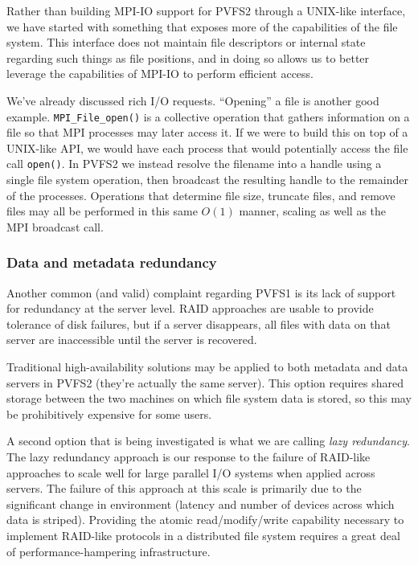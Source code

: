Rather than building MPI-IO support for PVFS2 through a UNIX-like interface,
we have started with something that exposes more of the capabilities of the
file system.  This interface does not maintain file descriptors or internal
state regarding such things as file positions, and in doing so allows us to
better leverage the capabilities of MPI-IO to perform efficient access.

We've already discussed rich I/O requests.  ``Opening'' a file is another good
example.  \texttt{MPI\_File\_open()} is a collective operation that gathers
information on a file so that MPI processes may later access it.  If we were
to build this on top of a UNIX-like API, we would have each process that would
potentially access the file call
\texttt{open()}.  In PVFS2 we instead resolve the filename into a handle using
a single file system operation, then broadcast the resulting handle to the
remainder of the processes.  Operations that determine file size, truncate
files, and remove files may all be performed in this same $O(1)$ manner,
scaling as well as the MPI broadcast call.

\subsubsection{Data and metadata redundancy}

Another common (and valid) complaint regarding PVFS1 is its lack of support
for redundancy at the server level.  RAID approaches are usable to provide
tolerance of disk failures, but if a server disappears, all files with data on
that server are inaccessible until the server is recovered.

Traditional high-availability solutions may be applied to both metadata and
data servers in PVFS2 (they're actually the same server).  This option
requires shared storage between the two machines on which file system data is
stored, so this may be prohibitively expensive for some users.

A second option that is being investigated is what we are calling \emph{lazy
redundancy}.  The lazy redundancy approach is our response to the failure of
RAID-like approaches to scale well for large parallel I/O systems when applied
across servers.  The failure of this approach at this scale is primarily due
to the significant change in environment (latency and number of devices across
which data is striped).  Providing the atomic read/modify/write capability
necessary to implement RAID-like protocols in a distributed file system
requires a great deal of performance-hampering infrastructure.

